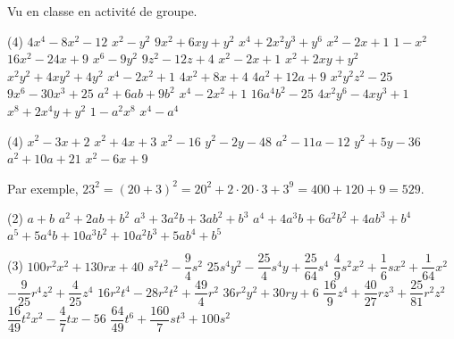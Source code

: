 \documentclass[a4paper,12pt]{report}
\begin{document}
\vspace*{-2\baselineskip}
\begin{core}
Vu en classe en activité de groupe.
\end{core}

\begin{core}
	\phantom{ }
	\begin{tasks}(4)
\task $4x^4 - 8x^2 - 12$
\task $x^2 - y^2$
\task $9x^2 + 6xy + y^2$
\task $x^4 + 2x^2y^3 + y^6$
\task $x^2 - 2x + 1$
\task $1 - x^2$
\task $16x^2 - 24x + 9$
\task $x^6 - 9y^2$
\task $9z^2 - 12z + 4$
\task $x^2 - 2x +1$
\task $x^2 + 2xy + y^2$
\task $x^2y^2 + 4xy^2 + 4y^2$
\task $x^4 - 2x^2 + 1$
\task $4x^2 + 8x + 4$
\task $4a^2 + 12a + 9$
\task $x^2y^2z^2 - 25$
\task $9x^6 - 30x^3 + 25$
\task $a^2 + 6ab + 9b^2$
\task $x^4 - 2x^2 + 1$
\task $16a^4b^2 - 25$
\task $4x^2y^6 - 4xy^3 + 1$
\task $x^8 + 2x^4y + y^2$
\task $1 - a^2x^8$
\task $x^4 - a^4$
	\end{tasks}
\end{core}

\begin{core}
	\phantom{ }
	\begin{tasks}(4)
\task $ x^2 - 3x + 2$
\task $ x^2 + 4x + 3$
\task $ x^2 - 16$
\task $ y^2 - 2y - 48$
\task $ a^2 - 11a - 12$
\task $ y^2 + 5y - 36$
\task $ a^2 + 10a + 21$
\task $ x^2 - 6x + 9$
\end{tasks}
\end{core}

\begin{core}
	Par exemple, $23^2=(20+3)^2=20^2+2\cdot 20\cdot 3+3^9=400+120+9=529$.
\end{core}
\begin{core}
	\phantom{ }
	\begin{tasks}(2)
\task $a + b$
\task $a^2 + 2ab + b^2$
\task $a^3 + 3a^2b + 3ab^2 + b^3$
\task $a^4 + 4a^3b + 6a^2b^2 + 4ab^3 + b^4$
\task $a^5 + 5a^4b + 10a^3b^2 + 10a^2b^3 + 5ab^4 + b^5$
	\end{tasks}
\end{core}
\begin{core}\phantom{ }

\begin{tasks}(3)
\task $100 r^2 x^2 + 130 r x + 40 $
\task $s^2 t^2-\dfrac{9}{4} s^2$
\task $25 s^4 y^2-\dfrac{25}{4} s^4 y + \dfrac{25}{64} s^4$
\task $\dfrac{4}{9} s^2 x^2 + \dfrac{1}{6} s x^2 + \dfrac{1}{64} x^2$
\task $-\dfrac{9}{25} r^4 z^2 + \dfrac{4}{25} z^4$
\task $16 r^2 t^4-28 r^2 t^2 + \dfrac{49}{4} r^2$
\task $36 r^2 y^2 + 30 r y + 6 $
\task $\dfrac{16}{9} z^4 + \dfrac{40}{27} r z^3 + \dfrac{25}{81} r^2 z^2$
\task $\dfrac{16}{49} t^2 x^2-\dfrac{4}{7} t x-56 $
\task $\dfrac{64}{49} t^6 + \dfrac{160}{7} s t^3 + 100 s^2$
\end{tasks}

\end{core}
\end{document}
